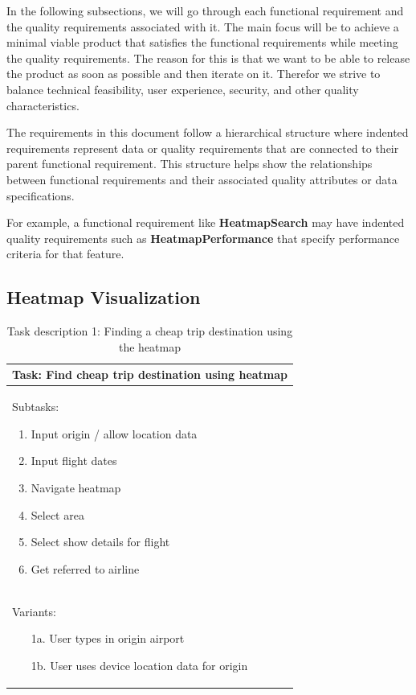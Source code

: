 In the following subsections, we will go through each functional requirement and the quality requirements associated with it. The main focus will be to achieve a minimal viable product that satisfies the functional requirements while meeting the quality requirements. The reason for this is that we want to be able to release the product as soon as possible and then iterate on it. Therefor we strive to balance technical feasibility, user experience, security, and other quality characteristics.

The requirements in this document follow a hierarchical structure where indented requirements represent data or quality requirements that are connected to their parent functional requirement. This structure helps show the relationships between functional requirements and their associated quality attributes or data specifications.

For example, a functional requirement like \textbf{HeatmapSearch} may have indented quality requirements such as \textbf{HeatmapPerformance} that specify performance criteria for that feature.


\subsection{Heatmap Visualization}

\begin{table}[H]
\begin{tabular}{|p{}|}
    \hline
    \textbf{Task: Find cheap trip destination using heatmap}\\
    \hline
    Subtasks:
    \begin{enumerate}
        \item Input origin / allow location data
        \item Input flight dates
        \item Navigate heatmap
        \item Select area
        \item Select show details for flight
        \item Get referred to airline
    \end{enumerate}\\
    \hline
    Variants:
    \begin{enumerate}
        \item[1a.] User types in origin airport
        \item[1b.] User uses device location data for origin
    \end{enumerate}\\
    \hline
\end{tabular}
\caption*{Task description 1: Finding a cheap trip destination using the heatmap}
\end{table}

